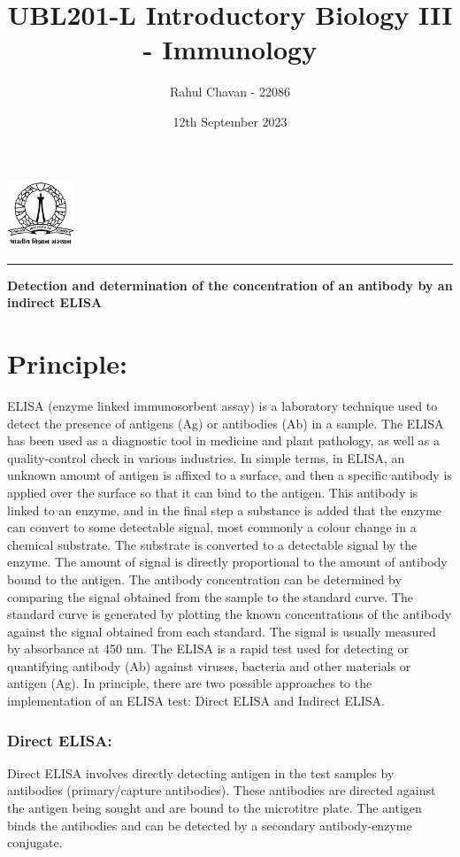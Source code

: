 \documentclass{report}
\title{\textbf{UBL201-L Introductory Biology III - Immunology}}
\author{Rahul Chavan - 22086}
\date{12th September 2023}
\renewcommand{\maketitle}{
 \begin{center}
    \includegraphics[width=2cm]{IISc_Master_Seal_Black.jpg}
    \vspace{0.5cm}

    \Large
    \textbf{\thetitle}
    
    \vspace{0.5cm}
    
    \Large
    \theauthor
    
    \vspace{0.2cm}
    
    \large
    \thedate

    \vspace{0.5cm}

    \hrule  
    
  \end{center}
}
\begin{document}
\maketitle
\begin{center}
    \large
    \textbf{Detection and determination of the concentration of an antibody by an indirect ELISA}
\end{center} 







\section*{Principle:} 
ELISA (enzyme linked immunosorbent assay) is a laboratory technique used to detect the presence of antigens (Ag) or
antibodies (Ab) in a sample. The ELISA has been used as a diagnostic tool in medicine and plant pathology, as well as a
quality-control check in various industries. In simple terms, in ELISA, an unknown amount of antigen is affixed to a surface,
and then a specific antibody is applied over the surface so that it can bind to the antigen. This antibody is linked to an enzyme,
and in the final step a substance is added that the enzyme can convert to some detectable signal, most commonly a colour
change in a chemical substrate. The substrate is converted to a detectable
signal by the enzyme. The amount of signal is directly proportional to the amount of antibody bound to the antigen. The
antibody concentration can be determined by comparing the signal obtained from the sample to the standard curve. The
standard curve is generated by plotting the known concentrations of the antibody against the signal obtained from each
standard. The signal is usually measured by absorbance at 450 nm. The ELISA is a rapid test used for detecting or
quantifying antibody (Ab) against viruses, bacteria and other materials or antigen (Ag). 
In principle, there are two possible approaches to the implementation of an ELISA test: Direct
ELISA and Indirect ELISA.
\subsubsection*{Direct ELISA:} 
Direct ELISA involves directly detecting antigen in the test samples by antibodies (primary/capture antibodies).
 These antibodies are directed against the antigen being sought and are bound to the microtitre plate. The antigen binds the
  antibodies and can be detected by a secondary antibody-enzyme conjugate.
\end{document}
